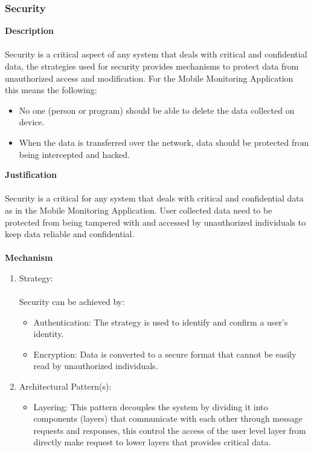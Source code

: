 \documentclass[hidelinks, 12pt, oneside]{article}
\begin{document}
			\subsubsection{Security}
				\textbf{Description} \\\\
				Security is a critical aspect of any system that deals with critical and confidential data, the strategies used for security provides mechanisms to protect data from unauthorized access and modification. For the Mobile Monitoring Application this means the following:
				\begin{itemize}
					\item No one (person or program) should be able to delete the data collected on device.
					\item When the data is transferred over the network, data should be protected from being intercepted and hacked.    
				\end{itemize}
				\textbf{Justification} \\\\
				Security is a critical for any system that deals with critical and confidential data as in the Mobile Monitoring Application. User collected data need to be protected from being tampered with and accessed by unauthorized individuals to keep data reliable and confidential.\\\\
				\textbf{Mechanism}
				\begin{enumerate}
					\item Strategy: \\\\
						Security can be achieved by:
						\begin{itemize}
							\item Authentication: The strategy is used to identify and confirm a user's identity.  
							\item Encryption: Data is converted to a secure format that cannot be easily read by unauthorized individuals. 
						\end{itemize}
					\item Architectural Pattern(s):
						\begin{itemize}
							\item Layering: This pattern decouples the system by dividing it into components (layers) that communicate with each other through message requests and responses, this control the access of the user level layer from directly make request to lower layers that provides critical data. 
						\end{itemize}
				\end{enumerate}		
\end{document}
